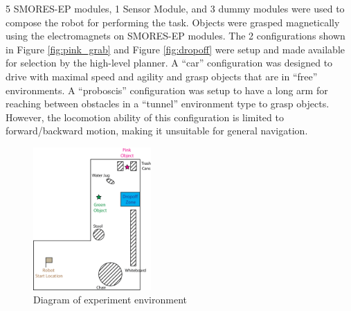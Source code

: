 \documentclass[conference]{IEEEtran}
\begin{document}
5 SMORES-EP modules, 1 Sensor Module, and 3 dummy modules were used to compose the robot for performing the task. Objects were grasped magnetically using the electromagnets on SMORES-EP modules. The 2 configurations shown in Figure \ref{fig:pink_grab} and Figure \ref{fig:dropoff} were setup and made available for selection by the high-level planner. A ``car'' configuration was designed to drive with maximal speed and agility and grasp objects that are in ``free'' environments. A ``proboscis'' configuration was setup to have a long arm for reaching between obstacles in a ``tunnel'' environment type to grasp objects. However, the locomotion ability of this configuration is limited to forward/backward motion, making it unsuitable for general navigation.

\begin{figure}
\begin{center}
\includegraphics[width=0.4\textwidth]{images/RSSMap.png}
\caption{Diagram of experiment environment}
\label{fig:map}
\end{center}
\end{figure}
\end{document}
